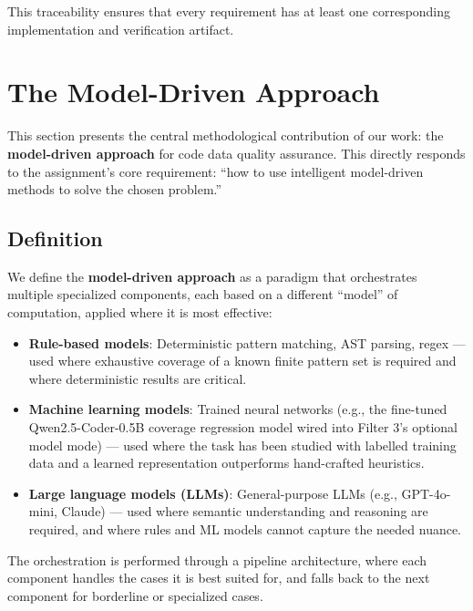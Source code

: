 \documentclass[acmlarge,nonacm,screen]{acmart}
\begin{document}
This traceability ensures that every requirement has at least one corresponding implementation and verification artifact.


\section{The Model-Driven Approach}
\label{sec:model-driven}

This section presents the central methodological contribution of our work: the \textbf{model-driven approach} for code data quality assurance. This directly responds to the assignment's core requirement: ``how to use intelligent model-driven methods to solve the chosen problem.''

\subsection{Definition}

We define the \textbf{model-driven approach} as a paradigm that orchestrates multiple specialized components, each based on a different ``model'' of computation, applied where it is most effective:

\begin{itemize}
    \item \textbf{Rule-based models}: Deterministic pattern matching, AST parsing, regex --- used where exhaustive coverage of a known finite pattern set is required and where deterministic results are critical.
    \item \textbf{Machine learning models}: Trained neural networks (e.g., the fine-tuned Qwen2.5-Coder-0.5B coverage regression model wired into Filter 3's optional model mode) --- used where the task has been studied with labelled training data and a learned representation outperforms hand-crafted heuristics.
    \item \textbf{Large language models (LLMs)}: General-purpose LLMs (e.g., GPT-4o-mini, Claude) --- used where semantic understanding and reasoning are required, and where rules and ML models cannot capture the needed nuance.
\end{itemize}

The orchestration is performed through a pipeline architecture, where each component handles the cases it is best suited for, and falls back to the next component for borderline or specialized cases.
\end{document}
